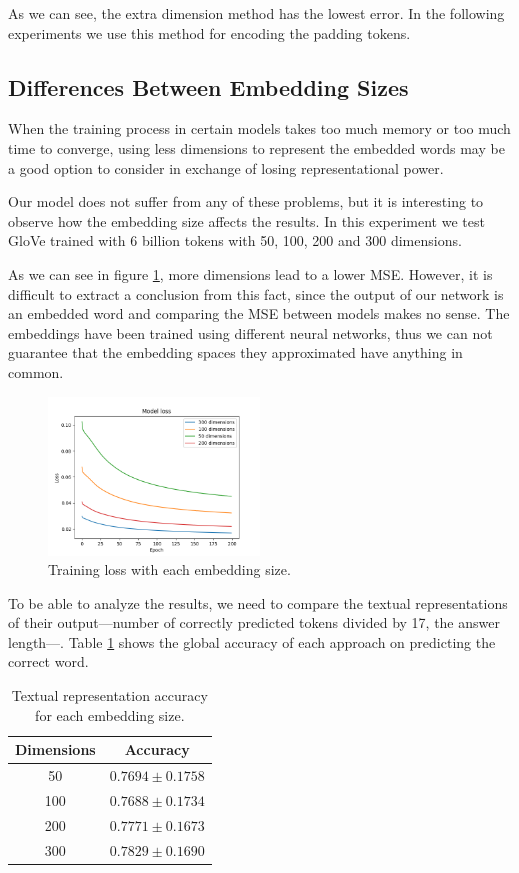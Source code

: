 \documentclass[]{article}
\begin{document}
	As we can see, the extra dimension method has the lowest error. In the following experiments we use this method for encoding the padding tokens.
	
	\subsection{Differences Between Embedding Sizes}
	
	When the training process in certain models takes too much memory or too much time to converge, using less dimensions to represent the embedded words may be a good option to consider in exchange of losing representational power.
	
	Our model does not suffer from any of these problems, but it is interesting to observe how the embedding size affects the results. In this experiment we test GloVe trained with 6 billion tokens with 50, 100, 200 and 300 dimensions.
	
	As we can see in figure \ref{f:sizes}, more dimensions lead to a lower MSE. However, it is difficult to extract a conclusion from this fact, since the output of our network is an embedded word and comparing the MSE between models makes no sense. The embeddings have been trained using different neural networks, thus we can not guarantee that the embedding spaces they approximated have anything in common.
	
	\begin{figure}[H]
		\centering
		\includegraphics[width=0.5\textwidth]{sizes}
		\caption{Training loss with each embedding size.}
		\label{f:sizes}
	\end{figure}
	
	To be able to analyze the results, we need to compare the textual representations of their output---number of correctly predicted tokens divided by 17, the answer length---. Table \ref{t:sizes} shows the global accuracy of each approach on predicting the correct word.
	
	\begin{table}[H]
		\centering
		\begin{tabular}{@{}cc@{}}
			\toprule
			Dimensions & Accuracy            \\ \midrule
			50         & $0.7694 \pm 0.1758$ \\
			100        & $0.7688 \pm 0.1734$ \\
			200        & $0.7771 \pm 0.1673$ \\
			300        & $0.7829 \pm 0.1690$ \\ \bottomrule
		\end{tabular}
		\caption{Textual representation accuracy for each embedding size.}
		\label{t:sizes}
	\end{table}
	
\end{document}
